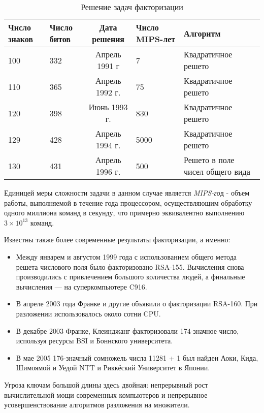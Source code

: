 \begin{table}[ht]
    \centering
    \begin{tabular}{@{}p{2.5cm}p{2.5cm}cp{2.5cm}p{4.5cm}@{}}
    \toprule
    \textbf{Число знаков} & \textbf{Число битов} & \textbf{Дата решения} & \textbf{Число MIPS-лет} & \textbf{Алгоритм} \\ \midrule
    100                              & 332                  & Апрель 1991 г         & 7                       & Квадратичное решето              \\
    110                              & 365                  & Апрель 1992 г.        & 75                      & Квадратичное решето              \\
    120                              & 398                  & Июнь 1993 г.          & 830                     & Квадратичное решето              \\
    129                              & 428                  & Апрель 1994 г.        & 5000                    & Квадратичное решето              \\
    130                              & 431                  & Апрель 1996 г.        & 500                     & Решето в поле чисел общего вида  \\ 
    \bottomrule
    \end{tabular}
    \caption{Решение задач факторизации}
    \label{table-prime-attacks}
  \end{table}

Единицей меры сложности задачи в данном случае является \textit{MIPS-го}д - объем работы, выполняемой в течение года процессором, осуществляющим обработку одного миллиона команд в секунду, что примерно эквивалентно выполнению {$3\times10^{13}$} команд.  
  
Известны также более современные результаты факторизации, а именно:  
    \begin{itemize}
      \item Между январем и августом 1999 года с использованием общего метода решета числового поля было факторизовано RSA-155. Вычисления снова производились с 
	привлечением большого количества людей, а финальные вычисления — на суперкомпьютере C916.
      \item В апреле 2003 года Франке и другие объявили о факторизации RSA-160. При разложении использовалось около сотни CPU.
      \item В декабре 2003 Франке, Клеинджанг факторизовали 174-значное число, используя ресурсы BSI и Боннского университета.
      \item В мае 2005 176-значный сомножель числа 11281 + 1 был найден Аоки, Кида, Шимоямой и Уедой NTT и Риккёский Университет в Японии.
    \end{itemize}
  
Угроза ключам большой длины здесь двойная: непрерывный рост вычислительной мощи современных компьютеров и непрерывное 
  усовершенствование алгоритмов разложения на множители.



